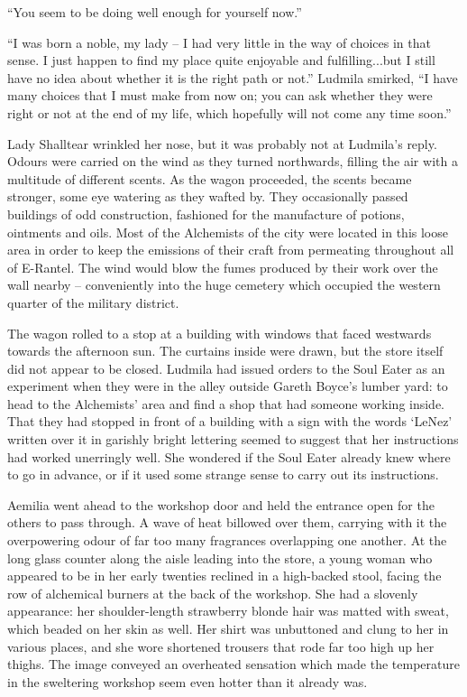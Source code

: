  

“You seem to be doing well enough for yourself now.”

 

“I was born a noble, my lady – I had very little in the way of choices in that sense. I just happen to find my place quite enjoyable and fulfilling...but I still have no idea about whether it is the right path or not.” Ludmila smirked, “I have many choices that I must make from now on; you can ask whether they were right or not at the end of my life, which hopefully will not come any time soon.”

 

Lady Shalltear wrinkled her nose, but it was probably not at Ludmila’s reply. Odours were carried on the wind as they turned northwards, filling the air with a multitude of different scents. As the wagon proceeded, the scents became stronger, some eye watering as they wafted by. They occasionally passed buildings of odd construction, fashioned for the manufacture of potions, ointments and oils. Most of the Alchemists of the city were located in this loose area in order to keep the emissions of their craft from permeating throughout all of E-Rantel. The wind would blow the fumes produced by their work over the wall nearby – conveniently into the huge cemetery which occupied the western quarter of the military district.

 

The wagon rolled to a stop at a building with windows that faced westwards towards the afternoon sun. The curtains inside were drawn, but the store itself did not appear to be closed. Ludmila had issued orders to the Soul Eater as an experiment when they were in the alley outside Gareth Boyce’s lumber yard: to head to the Alchemists’ area and find a shop that had someone working inside. That they had stopped in front of a building with a sign with the words ‘LeNez’ written over it in garishly bright lettering seemed to suggest that her instructions had worked unerringly well. She wondered if the Soul Eater already knew where to go in advance, or if it used some strange sense to carry out its instructions.

 

Aemilia went ahead to the workshop door and held the entrance open for the others to pass through. A wave of heat billowed over them, carrying with it the overpowering odour of far too many fragrances overlapping one another. At the long glass counter along the aisle leading into the store, a young woman who appeared to be in her early twenties reclined in a high-backed stool, facing the row of alchemical burners at the back of the workshop. She had a slovenly appearance: her shoulder-length strawberry blonde hair was matted with sweat, which beaded on her skin as well. Her shirt was unbuttoned and clung to her in various places, and she wore shortened trousers that rode far too high up her thighs. The image conveyed an overheated sensation which made the temperature in the sweltering workshop seem even hotter than it already was.

